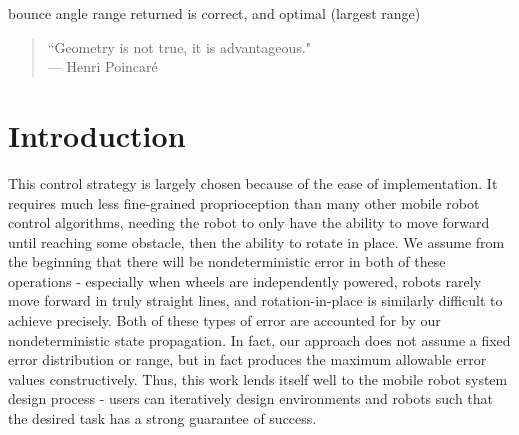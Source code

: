 \documentclass[]{styles/svproc}  %
\begin{document}
\begin{corollary} bounce angle range returned is correct, and optimal
   (largest range)
\end{corollary}


%
%
%
\iffalse

{\small
\begin{center}
\begin{quotation}
``Geometry is not true, it is advantageous." \\
\hfill    --- Henri Poincar\'e
\end{quotation}
\end{center}
}


\section{Introduction} 

This control strategy is largely chosen because of the ease of implementation.
It requires much less fine-grained proprioception than many other mobile robot
control algorithms, needing the robot to only have the ability to move forward
until reaching some obstacle, then the ability to rotate in place. We assume
from the beginning that there will be nondeterministic error in both of these
operations - especially when wheels are independently powered, robots rarely
move forward in truly straight lines, and rotation-in-place is similarly
difficult to achieve precisely. Both of these types of error are accounted for
by our nondeterministic state propagation. In fact, our approach does not assume
a fixed error distribution or range, but in fact produces the maximum allowable
error values constructively. Thus, this work lends itself well to the mobile
robot system design process - users can iteratively design environments and
robots such that the desired task has a strong guarantee of success.
\end{document}

